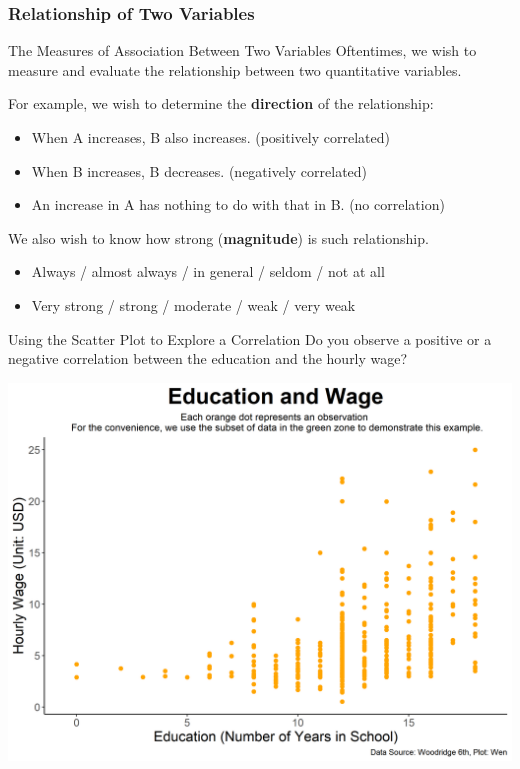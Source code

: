\documentclass{beamer}
\begin{document}
\subsubsection{Relationship of Two Variables}
\begin{frame}{The Measures of Association Between Two Variables}
Oftentimes, we wish to measure and evaluate the relationship between two quantitative variables.\linebreak 

For example, we wish to determine the \textbf{direction} of the relationship: 
\begin{itemize}
\item When A increases, B also increases. (positively correlated)
\item When B increases, B decreases. (negatively correlated)
\item An increase in A has nothing to do with that in B. (no correlation)
\end{itemize}

We also wish to know how strong (\textbf{magnitude}) is such relationship.
\begin{itemize}
\item Always / almost always / in general / seldom / not at all
\item Very strong / strong / moderate / weak / very weak
\end{itemize}


\end{frame}

\begin{frame}{Using the Scatter Plot to Explore a Correlation}
\vspace{0.2 cm}
Do you observe a positive or a negative correlation between the education and the hourly wage? 

\begin{center}
\includegraphics[scale=0.40]{images/plotCorrelations.png}
\end{center}

\end{frame}
\end{document}
